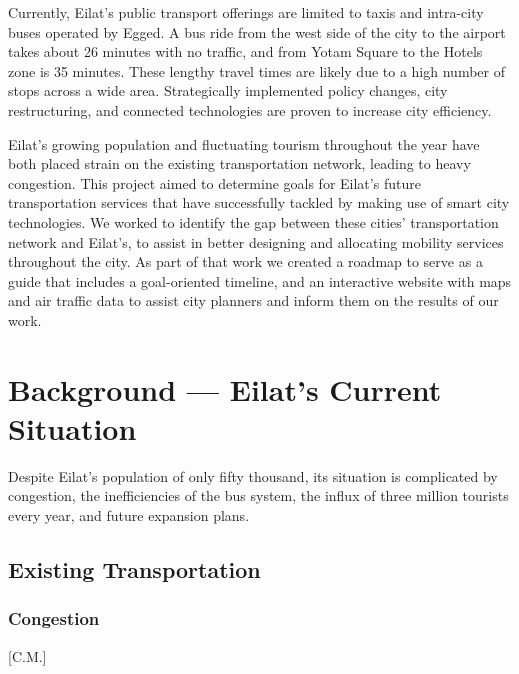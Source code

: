 \documentclass[12pt]{article}                       %
\begin{document}
Currently, Eilat's public transport offerings are limited to taxis and intra-city buses operated by Egged. A bus ride from the west side of the city to the airport takes about 26 minutes with no traffic, and from Yotam Square to the Hotels zone is 35 minutes. These lengthy travel times are likely due to a high number of stops across a wide area. Strategically implemented policy changes, city restructuring, and connected technologies are proven to increase city efficiency.

Eilat's growing population and fluctuating tourism throughout the year have both placed strain on the existing transportation network, leading to heavy congestion. This project aimed to determine goals for Eilat's future transportation services that have successfully tackled by making use of smart city technologies. We worked to identify the gap between these cities' transportation network and Eilat's, to assist in better designing and allocating mobility services throughout the city. As part of that work we created a roadmap to serve as a guide that includes a goal-oriented timeline, and an interactive website with maps and air traffic data to assist city planners and inform them on the results of our work.
 
\newpage
\section{Background --- Eilat's Current Situation }
Despite Eilat's population of only fifty thousand, its situation is complicated by congestion, the inefficiencies of the bus system, the influx of three million tourists every year, and future expansion plans.

\subsection{Existing Transportation}
\subsubsection{Congestion}[C.M.]
\end{document}
